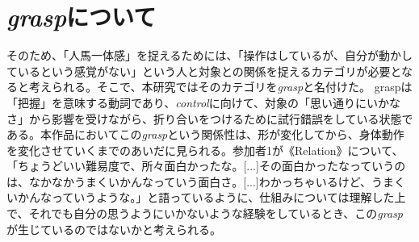 
\section{\textit{grasp}について}
そのため、「人馬一体感」を捉えるためには、「操作はしているが、自分が動かしているという感覚がない」という人と対象との関係を捉えるカテゴリが必要となると考えられる。そこで、本研究ではそのカテゴリを\textit{grasp}と名付けた。
graspは「把握」を意味する動詞であり、\textit{control}に向けて、対象の「思い通りにいかなさ」から影響を受けながら、折り合いをつけるために試行錯誤をしている状態である。本作品においてこの\textit{grasp}という関係性は、形が変化してから、身体動作を変化させていくまでのあいだに見られる。参加者1が《Relation》について、「ちょうどいい難易度で、所々面白かったな。[...]その面白かったなっていうのは、なかなかうまくいかんなっていう面白さ。[...]わかっちゃいるけど、うまくいかんなっていうような。」と語っているように、仕組みについては理解した上で、それでも自分の思うようにいかないような経験をしているとき、この\textit{grasp}が生じているのではないかと考えられる。

